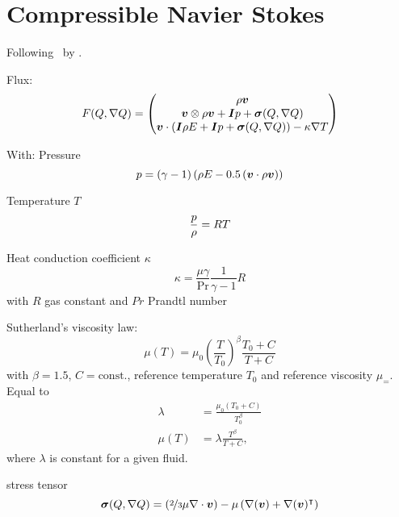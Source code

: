 \section{Compressible Navier Stokes}
Following~\cite{dumbser2010arbitrary} by \citeauthor{dumbser2010arbitrary}.

Flux:
\begin{equation}
  F(Q, \nabla Q) = 
  \begin{pmatrix}
    \rho \bm{v} \\
    \bm{v}  \otimes \rho \bm{v} + \bm{I} p + \bm{\sigma} (Q, \nabla Q)  \\
    \bm{v} \cdot (\bm{I} \rho E + \bm{I} p + \bm{\sigma} (Q, \nabla Q)) - \kappa \nabla T
  \end{pmatrix}
\end{equation}

With:
Pressure \pressure
\begin{equation}
  p = (\gamma - 1) \left(\rho E - 0.5 \left(\bm{v} \cdot \rho \bm{v} \right) \right)
\end{equation}

Temperature $T$
\begin{equation}
 \frac{p}{\rho} = RT
\end{equation}

Heat conduction coefficient $\kappa$
\begin{equation}
  \label{eq:heat-conduction-coeff}
  \kappa = \frac{\mu \gamma}{\Pr} \frac{1}{\gamma - 1} R
\end{equation}
with $R$ gas constant and $Pr$ Prandtl number

Sutherland's viscosity law:
\begin{equation}
  \label{eq:sutherland}
 \mu(T)  = \mu_0 {\left(\frac{T}{T_0}  \right)}^{\beta} \frac{T_0 + C}{T + C}
\end{equation}
with \(\beta = 1.5\), \(C = \text{const.}\), reference temperature $T_0$ and reference viscosity $\mu_=$.
Equal to
\begin{align}
  \lambda &= \frac{\mu_0 (T_0 + C)}{T_0^\beta} \\
  \mu(T) &= \lambda \frac{T^\beta}{T + C},
\end{align}
where $\lambda$ is constant for a given fluid.

stress tensor
\begin{equation}
  \label{eq:stress-tensor}
  \bm{\sigma}(Q, \nabla Q) = \left(\nicefrac{2}{3} \mu \nabla \cdot \bm{v} \right) -
  \mu \left( \nabla (\bm{v}) + \nabla ( \bm{v} )^\intercal \right)
\end{equation}

